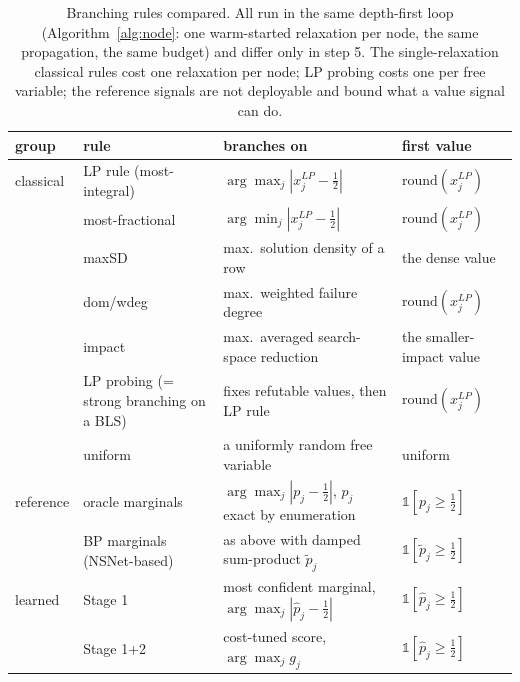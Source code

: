 \documentclass[final,5p,times,twocolumn,authoryear]{elsarticle}
\begin{document}
\begin{table}[t]
\centering
\caption{Branching rules compared. All run in the same depth-first loop (Algorithm~\ref{alg:node}: one warm-started relaxation per node, the same propagation, the same budget) and differ only in step 5. The single-relaxation classical rules cost one relaxation per node; LP probing costs one per free variable; the reference signals are not deployable and bound what a value signal can do.}
\label{tab:arms}
\small\begin{tabular}{llll}
\toprule
group & rule & branches on & first value \\
\midrule
classical & LP rule (most-integral) & $\arg\max_j|x^{LP}_j-\tfrac12|$ & $\mathrm{round}(x^{LP}_j)$ \\
& most-fractional & $\arg\min_j|x^{LP}_j-\tfrac12|$ & $\mathrm{round}(x^{LP}_j)$ \\
& maxSD \citep{pesant2012counting} & max.\ solution density of a row & the dense value \\
& dom/wdeg \citep{boussemart2004boosting} & max.\ weighted failure degree & $\mathrm{round}(x^{LP}_j)$ \\
& impact \citep{refalo2004impact} & max.\ averaged search-space reduction & the smaller-impact value \\
& LP probing (= strong branching on a BLS) & fixes refutable values, then LP rule & $\mathrm{round}(x^{LP}_j)$ \\
& uniform & a uniformly random free variable & uniform \\
\midrule
reference & oracle marginals & $\arg\max_j|p_j-\tfrac12|$, $p_j$ exact by enumeration & $\mathbb{1}[p_j\ge\tfrac12]$ \\
& BP marginals (NSNet-based) & as above with damped sum-product $\tilde p_j$ & $\mathbb{1}[\tilde p_j\ge\tfrac12]$ \\
\midrule
learned & Stage 1 & most confident marginal, $\arg\max_j|\hat p_j-\tfrac12|$ & $\mathbb{1}[\hat p_j\ge\tfrac12]$ \\
& Stage 1+2 & cost-tuned score, $\arg\max_j g_j$ & $\mathbb{1}[\hat p_j\ge\tfrac12]$ \\
\bottomrule
\end{tabular}
\end{table}
\end{document}
